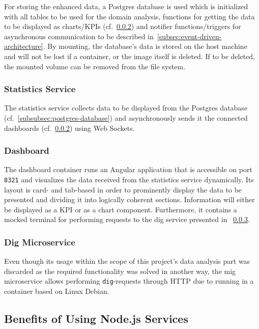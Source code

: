For storing the enhanced data, a Postgres database is used which is initialized with all tables to be used for the domain analysis, functions for getting the data to be displayed as charts/KPIs (cf.~\ref{subsubsec:dashboard})
and notifier functions/triggers for asynchronous communication to be described in~\ref{subsec:event-driven-architecture}.
By mounting, the database's data is stored on the host machine and will not be lost if a container, or the image itself is deleted.
If to be deleted, the mounted volume can be removed from the file system.

\subsubsection{Statistics Service}\label{subsubsec:statistics-service}

The statistics service collects data to be displayed from the Postgres database (cf.~\ref{subsubsec:postgres-database}) and asynchronously sends it the connected dashboards (cf.~\ref{subsubsec:dashboard}) using Web Sockets.~\autocite[cf.][]{MDNWebDocs.2021}

\subsubsection{Dashboard}\label{subsubsec:dashboard}

The dashboard container runs an Angular application that is accessible on port \texttt{8321} and visualizes the data received from the statistics service dynamically.
Its layout is card- and tab-based in order to prominently display the data to be presented and dividing it into logically coherent sections.
Information will either be displayed as a KPI or as a chart component.
Furthermore, it contains a mocked terminal for performing requests to the dig service presented in ~\ref{subsubsec:dig-microservice}.

\subsubsection{Dig Microservice}\label{subsubsec:dig-microservice}

Even though its usage within the scope of this project's data analysis part was discarded as the required functionality was solved in another way, the mig microservice allows performing \texttt{dig}-requests through HTTP due to running in a container based on Linux Debian.

\subsection{Benefits of Using Node.js Services}\label{subsec:choosing-a-node-based-environment}

